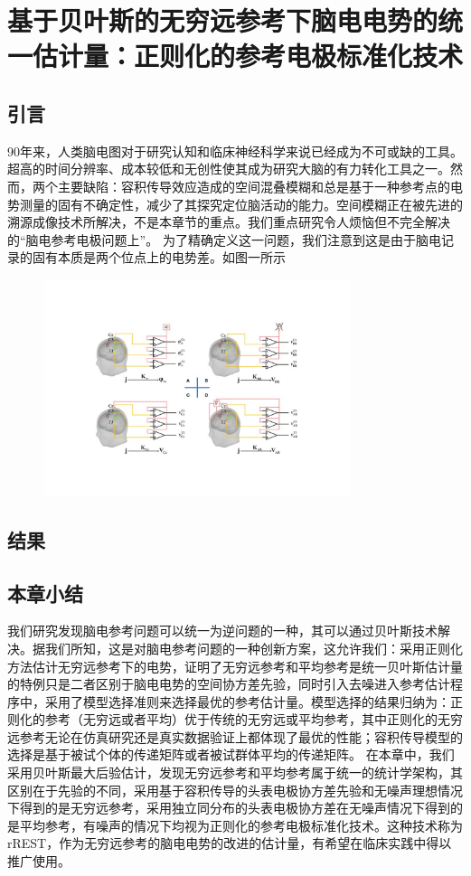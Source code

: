 \chapter{基于贝叶斯的无穷远参考下脑电电势的统一估计量：正则化的参考电极标准化技术}

\section{引言}
90年来，人类脑电图对于研究认知和临床神经科学来说已经成为不可或缺的工具。超高的时间分辨率、成本较低和无创性使其成为研究大脑的有力转化工具之一。然而，两个主要缺陷：容积传导效应造成的空间混叠模糊和总是基于一种参考点\cite{teplan2002fundamentals}的电势测量的固有不确定性，减少了其探究定位脑活动的能力。空间模糊正在被先进的溯源成像技术所解决，不是本章节的重点。我们重点研究令人烦恼但不完全解决的“脑电参考电极问题上”。
为了精确定义这一问题，我们注意到这是由于脑电记录的固有本质是两个位点上的电势差。如图一所示
\begin{figure}[h]
	\centering
	\includegraphics[width=0.8\textwidth,natwidth=610,natheight=642]{pic/3.1.pdf}
\end{figure}


\section{结果}

\section{本章小结}
我们研究发现脑电参考问题可以统一为逆问题的一种，其可以通过贝叶斯技术解决。据我们所知，这是对脑电参考问题的一种创新方案，这允许我们：采用正则化方法估计无穷远参考下的电势，证明了无穷远参考和平均参考是统一贝叶斯估计量的特例只是二者区别于脑电电势的空间协方差先验，同时引入去噪进入参考估计程序中，采用了模型选择准则来选择最优的参考估计量。模型选择的结果归纳为：正则化的参考（无穷远或者平均）优于传统的无穷远或平均参考，其中正则化的无穷远参考无论在仿真研究还是真实数据验证上都体现了最优的性能；容积传导模型的选择是基于被试个体的传递矩阵或者被试群体平均的传递矩阵。
在本章中，我们采用贝叶斯最大后验估计，发现无穷远参考和平均参考属于统一的统计学架构，其区别在于先验的不同，采用基于容积传导的头表电极协方差先验和无噪声理想情况下得到的是无穷远参考，采用独立同分布的头表电极协方差在无噪声情况下得到的是平均参考，有噪声的情况下均视为正则化的参考电极标准化技术。这种技术称为rREST，作为无穷远参考的脑电电势的改进的估计量，有希望在临床实践中得以推广使用。